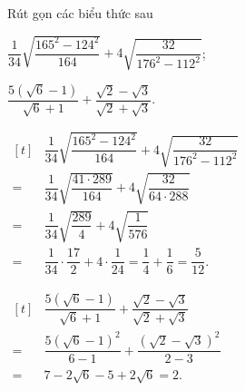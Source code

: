 \begin{bt}%
	Rút gọn các biểu thức sau
	\begin{listEX}[2]
	\item $\dfrac{1}{34}\sqrt{\dfrac{165^2 - 124^2}{164}} + 4\sqrt{\dfrac{32}{176^2 - 112^2}}$;
	\item $\dfrac{5(\sqrt{6} - 1)}{\sqrt{6} + 1} + \dfrac{\sqrt{2} - \sqrt{3}}{\sqrt{2} + \sqrt{3}}$.
	\end{listEX}
	\loigiai
	{
\begin{listEX}[2]
\item \allowdisplaybreaks $\begin{aligned}[t]
	&\dfrac{1}{34}\sqrt{\dfrac{165^2 - 124^2}{164}} + 4\sqrt{\dfrac{32}{176^2 - 112^2}}\\
	=&\dfrac{1}{34}\sqrt{\dfrac{41 \cdot 289}{164}} + 4\sqrt{\dfrac{32}{64 \cdot 288}}\\
	=&\dfrac{1}{34}\sqrt{\dfrac{289}{4}} + 4\sqrt{\dfrac{1}{576}}\\
	=&\dfrac{1}{34}\cdot\dfrac{17}{2} + 4\cdot\dfrac{1}{24}=\dfrac{1}{4} + \dfrac{1}{6}=\dfrac{5}{12}.
 \end{aligned}$
	\item \allowdisplaybreaks $ 
	\begin{aligned}[t]
	&\dfrac{5(\sqrt{6} - 1)}{\sqrt{6} + 1} + \dfrac{\sqrt{2} - \sqrt{3}}{\sqrt{2} + \sqrt{3}}\\
	=&\dfrac{5(\sqrt{6} - 1)^2}{6 - 1} + \dfrac{(\sqrt{2} - \sqrt{3})^2}{2 - 3}\\
	=&7 - 2\sqrt{6} - 5 + 2\sqrt{6}=2.
 	\end{aligned}$
\end{listEX}
	}
\end{bt}
